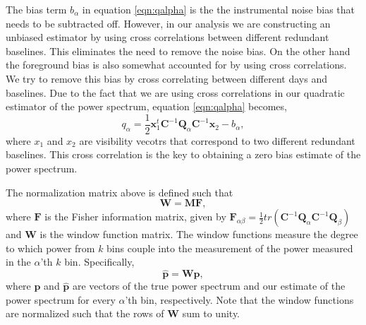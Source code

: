 \documentclass[twocolumn,numberedappendix]{emulateapj} \shorttitle{PSA64}
\newcommand{\x}{\mathbf{x}} \newcommand{\xhat}{\hat{\mathbf{x}}}
\begin{document}
The bias term $b_{\alpha}$ in equation \ref{eqn:qalpha} is the the instrumental
noise bias that needs to be subtracted off. However, in our analysis we are
constructing an unbiased estimator by using cross correlations between different
redundant baselines. This eliminates the need to remove the noise bias. On the
other hand the foreground bias is also somewhat accounted for by using cross
correlations. We try to remove this bias by cross correlating between different
days and baselines. Due to the fact that we are using cross correlations in our
quadratic estimator of the power spectrum, equation \ref{eqn:qalpha} becomes, 
\begin{equation}\label{eqn:qalpha_unbiased}
    q_{\alpha} =
\frac{1}{2}\x_{1}^{t}\mathbf{C}^{-1}\mathbf{Q}_{\alpha}\mathbf{C}^{-1}\x_{2} - b_{\alpha},
\end{equation}
where $x_{1}$ and $x_{2}$ are visibility vecotrs that correspond to two
different redundant baselines. This cross correlation is the key to obtaining a
zero bias estimate of the power spectrum. 

The normalization matrix above is defined such that
\begin{equation}\label{eqn:window_def}
    \mathbf{W} = \mathbf{M}\mathbf{F}, 
\end{equation}
where $\mathbf{F}$ is the Fisher information matrix, given by
$\mathbf{F}_{\alpha\beta} =
\frac{1}{2}tr(\mathbf{C}^{-1}\mathbf{Q}_{\alpha}\mathbf{C}^{-1}\mathbf{Q}_{\beta})$
and $\mathbf{W}$ is the window function matrix. The window functions measure the
degree to which power from $k$ bins couple into the measurement of the power
measured in the $\alpha$'th $k$ bin. Specifically, 
\begin{equation}\label{eqn:true_pspec_2_est_pspec}
    \hat{\mathbf{p}} = \mathbf{W}\mathbf{p}, 
\end{equation}
where $\mathbf{p}$ and $\hat{\mathbf{p}}$ are vectors of the true power spectrum and our
estimate of the power spectrum for every $\alpha$'th bin, respectively. Note
that the window functions are normalized such that the rows of $\mathbf{W}$ sum
to unity.
\end{document}
